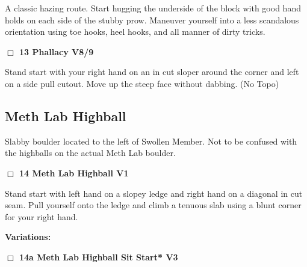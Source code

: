 \begin{multicols}{2}
\begin{adjustwidth}{1.3em}{}
A classic hazing route. Start hugging the underside of the block with good hand holds on each side of the stubby prow. Maneuver yourself into a less scandalous orientation using toe hooks, heel hooks, and  all manner of dirty tricks.
\end{adjustwidth}




\needspace{2em}
\label{rt:Phallacy}
\colorbox{Goldenrod!20}{
\parbox{0.95\linewidth}{
\hspace{-1ex}\textbf{$\Box$
13 Phallacy V8/9  
}}}
\begin{adjustwidth}{1.3em}{}			

Stand start with your right hand on an in cut sloper around the corner and left on a side pull cutout. Move up the steep face without dabbing. 
  (No Topo)
\end{adjustwidth}





\needspace{10em}
\subsection*{Meth Lab Highball}\label{bf:Meth Lab Highball}

Slabby boulder located to the left of Swollen Member. Not to be confused with the highballs on the actual Meth Lab boulder.\\



\needspace{2em}
\label{rt:Meth Lab Highball}
\colorbox{green!20}{
\parbox{0.95\linewidth}{
\hspace{-1ex}\textbf{$\Box$
14 Meth Lab Highball V1  \warn
}}}
\begin{adjustwidth}{1.3em}{}			

Stand start with left hand on a slopey ledge and right hand on a diagonal in cut seam. Pull yourself onto the ledge and climb a tenuous slab using a blunt corner for your right hand.
\end{adjustwidth}


\begin{adjustwidth}{0.5cm}{}				
\needspace{4em}
\textbf{Variations:} \newline

\needspace{2em}
\label{vr:Meth Lab Highball Sit Start}
\colorbox{green!20}{
\parbox{0.95\linewidth}{
\hspace{-1ex}\textbf{$\Box$
14a Meth Lab Highball Sit Start* V3  
}}}
\begin{adjustwidth}{1.3em}{}			


\end{adjustwidth}
\end{adjustwidth}
\end{multicols}
